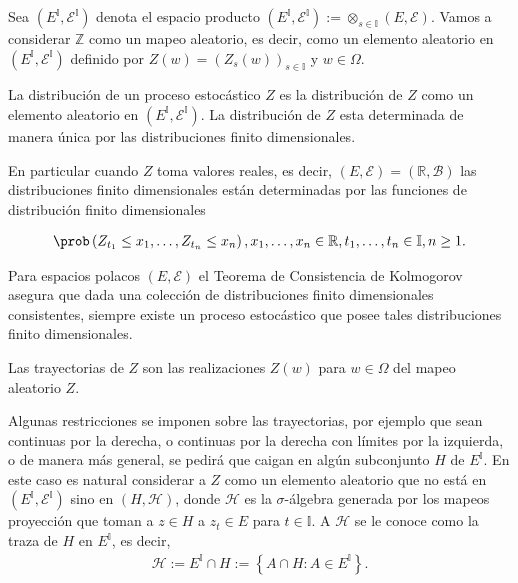 Sea $\left(E^{\mathbb{I}},\mathcal{E}^{\mathbb{I}}\right)$ denota el espacio producto $\left(E^{\mathbb{I}},\mathcal{E}^{\mathbb{I}}\right):=\otimes_{s\in\mathbb{I}}\left(E,\mathcal{E}\right)$. Vamos a considerar $\mathbb{Z}$ como un mapeo aleatorio, es decir, como un elemento aleatorio en $\left(E^{\mathbb{I}},\mathcal{E}^{\mathbb{I}}\right)$ definido por $Z\left(w\right)=\left(Z_{s}\left(w\right)\right)_{s\in\mathbb{I}}$ y $w\in\Omega$.

\begin{Note}
La distribuci\'on de un proceso estoc\'astico $Z$ es la distribuci\'on de $Z$ como un elemento aleatorio en $\left(E^{\mathbb{I}},\mathcal{E}^{\mathbb{I}}\right)$. La distribuci\'on de $Z$ esta determinada de manera \'unica por las distribuciones finito dimensionales.
\end{Note}

\begin{Note}
En particular cuando $Z$ toma valores reales, es decir, $\left(E,\mathcal{E}\right)=\left(\mathbb{R},\mathcal{B}\right)$ las distribuciones finito dimensionales est\'an determinadas por las funciones de distribuci\'on finito dimensionales

\begin{eqnarray}
\prob\left(Z_{t_{1}}\leq x_{1},\ldots,Z_{t_{n}}\leq x_{n}\right),x_{1},\ldots,x_{n}\in\mathbb{R},t_{1},\ldots,t_{n}\in\mathbb{I},n\geq1.
\end{eqnarray}
\end{Note}

\begin{Note}
Para espacios polacos $\left(E,\mathcal{E}\right)$ el Teorema de Consistencia de Kolmogorov asegura que dada una colecci\'on de distribuciones finito dimensionales consistentes, siempre existe un proceso estoc\'astico que posee tales distribuciones finito dimensionales.
\end{Note}


\begin{Def}
Las trayectorias de $Z$ son las realizaciones $Z\left(w\right)$ para $w\in\Omega$ del mapeo aleatorio $Z$.
\end{Def}

\begin{Note}
Algunas restricciones se imponen sobre las trayectorias, por ejemplo que sean continuas por la derecha, o continuas por la derecha con l\'imites por la izquierda, o de manera m\'as general, se pedir\'a que caigan en alg\'un subconjunto $H$ de $E^{\mathbb{I}}$. En este caso es natural considerar a $Z$ como un elemento aleatorio que no est\'a en $\left(E^{\mathbb{I}},\mathcal{E}^{\mathbb{I}}\right)$ sino en $\left(H,\mathcal{H}\right)$, donde $\mathcal{H}$ es la $\sigma$-\'algebra generada por los mapeos proyecci\'on que toman a $z\in H$ a $z_{t}\in E$ para $t\in\mathbb{I}$. A $\mathcal{H}$ se le conoce como la traza de $H$ en $E^{\mathbb{I}}$, es decir,
\begin{eqnarray}
\mathcal{H}:=E^{\mathbb{I}}\cap H:=\left\{A\cap H:A\in E^{\mathbb{I}}\right\}.
\end{eqnarray}
\end{Note}


